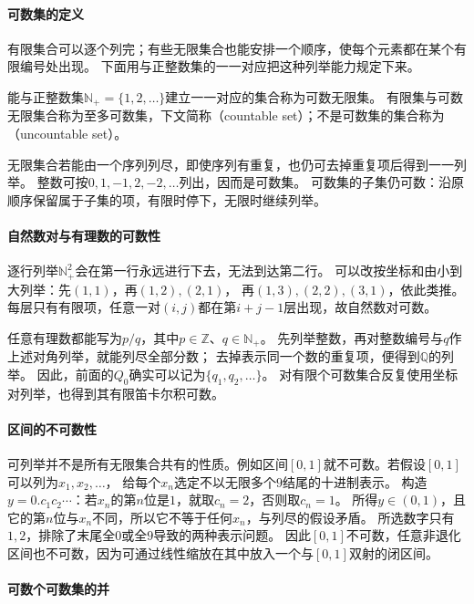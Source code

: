 \paragraph{可数集的定义}

有限集合可以逐个列完；有些无限集合也能安排一个顺序，使每个元素都在某个有限编号处出现。
下面用与正整数集的一一对应把这种列举能力规定下来。
\begin{definition}[可数集]
\label{def:analysis-countable-set}
能与正整数集$\mathbb N_+=\{1,2,\ldots\}$建立一一对应的集合称为可数无限集。
有限集与可数无限集合称为至多可数集，下文简称（countable set）；不是可数集的集合称为（uncountable set）。
\end{definition}

无限集合若能由一个序列列尽，即使序列有重复，也仍可去掉重复项后得到一一列举。
整数可按$0,1,-1,2,-2,\ldots$列出，因而是可数集。
可数集的子集仍可数：沿原顺序保留属于子集的项，有限时停下，无限时继续列举。

\paragraph{自然数对与有理数的可数性}

逐行列举$\mathbb N_+^2$会在第一行永远进行下去，无法到达第二行。
可以改按坐标和由小到大列举：先$(1,1)$，再$(1,2),(2,1)$，
再$(1,3),(2,2),(3,1)$，依此类推。
每层只有有限项，任意一对$(i,j)$都在第$i+j-1$层出现，故自然数对可数。

任意有理数都能写为$p/q$，其中$p\in\mathbb Z$、$q\in\mathbb N_+$。
先列举整数，再对整数编号与$q$作上述对角列举，就能列尽全部分数；
去掉表示同一个数的重复项，便得到$\mathbb Q$的列举。
因此，前面的$Q_0$确实可以记为$\{q_1,q_2,\ldots\}$。
对有限个可数集合反复使用坐标对列举，也得到其有限笛卡尔积可数。


\paragraph{区间的不可数性}

可列举并不是所有无限集合共有的性质。例如区间$[0, 1]$就不可数。若假设$[0,1]$可以列为$x_1,x_2,\ldots$，
给每个$x_n$选定不以无限多个$9$结尾的十进制表示。
构造$y=0.c_1c_2\cdots$：若$x_n$的第$n$位是$1$，就取$c_n=2$，否则取$c_n=1$。
所得$y\in(0,1)$，且它的第$n$位与$x_n$不同，所以它不等于任何$x_n$，与列尽的假设矛盾。
所选数字只有$1,2$，排除了末尾全$0$或全$9$导致的两种表示问题。
因此$[0,1]$不可数，任意非退化区间也不可数，因为可通过线性缩放在其中放入一个与$[0,1]$双射的闭区间。

\paragraph{可数个可数集的并}


